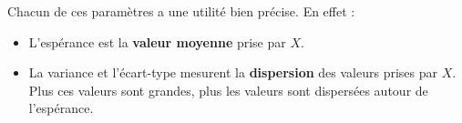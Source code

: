 	Chacun de ces paramètres a une utilité bien précise. En effet :

	\begin{formula}
		\begin{itemize}
			\item L'espérance est la \textbf{valeur moyenne} prise par $X$.
			\item La variance et l'écart-type mesurent la \textbf{dispersion} des valeurs prises par $X$. Plus ces valeurs sont grandes, plus les valeurs sont dispersées autour de l'espérance.
		\end{itemize}
	\end{formula}

